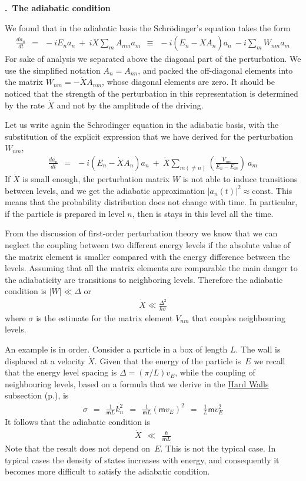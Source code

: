\documentclass[onecolumn,fleqn, 11pt]{revtex4}
\newcommand{\const}{\mathrm{const}}
\newcommand{\mass}{\mathsf{m}}
\newcommand{\beq}{\begin{eqnarray}}
\newcommand{\eeq}{\end{eqnarray}}
\renewcommand{\thesubsection}{\arabic{subsection}}
\renewcommand{\thesubsubsection}{\arabic{subsubsection}}
\newcommand{\sheadC}[1]
{
\addtocounter{subsubsection}{1}
\vspace{5mm}
{\bf \thesubsection.\thesubsubsection \ #1}  
\nopagebreak
\phantomsection
}
\begin{document}
 
\sheadC{The adiabatic condition}

We found that in the adiabatic basis 
the Schr\"{o}dinger's equation takes the form
\beq
\frac{d a_n}{dt} 
\ \ = \ \ -i E_n a_n \ + \ i \dot{X}\sum_m A_{nm} a_m 
 \ \ \equiv \ \ -i(E_n-\dot{X}A_n)a_n \ -i\sum_m W_{nm} a_m 
\eeq
For sake of analysis we separated above  
the diagonal part of the perturbation.
We use the simplified notation $A_n=A_{nn}$, 
and packed the off-diagonal elements 
into the matrix $W_{nm}=-\dot{X}A_{nm}$,
whose diagonal elements are zero. 
It should be noticed that the strength of the perturbation in this 
representation is determined by the rate $\dot{X}$ and not by 
the amplitude of the driving. 

Let us write again the Schrodinger equation 
in the adiabatic basis, with the substitution 
of the explicit expression that we have derived 
for the perturbation $W_{nm}$,  
\beq
\frac{d a_n}{dt} \ \ = \ \ 
-i(E_n-\dot{X}A_n)a_n 
\ + \ 
\dot{X} \sum_{m (\ne n)} \left(\frac{V_{nm}}{E_n-E_m}\right) \ a_m
\eeq
If $\dot{X}$ is small enough,  
the perturbation matrix $W$ is not able to induce 
transitions between levels, 
and we get the adiabatic 
approximation $|a_n(t)|^2 \approx \const$.
This means that the probability distribution 
does not change with time. In particular, 
if the particle is prepared in level $n$, 
then is stays in this level all the time. 


From the discussion of first-order 
perturbation theory we know that we can neglect the coupling 
between two different energy levels if the absolute value of 
the matrix element is smaller compared with the 
energy difference between the levels. 
Assuming that all the matrix elements are 
comparable the main danger to the adiabaticity 
are transitions to neighboring levels.  
Therefore the adiabatic condition is ${|W| \ll \Delta}$ or 
\beq
\dot{X} \ll \frac{\Delta^2}{\hbar \sigma} 
\eeq
where $\sigma$ is the estimate for the 
matrix element $V_{nm}$ that couples 
neighbouring levels.


An example is in order. Consider a particle in a box of length ${L}$. 
The wall is displaced at a velocity ${\dot{X}}$. 
Given that the energy of the particle is~$E$ we recall that 
the energy level spacing is ${\Delta = (\pi/L)v_E }$,   
while the coupling of neighbouring levels, based on a formula 
that we derive in the \hyperref[sWalls]{Hard Walls} subsection (p.\pageref{sWalls}), is 
\beq
\sigma \ \ = \ \ \frac{1}{\mass L} k_n^2 
\ \ = \ \ \frac{1}{\mass L} (\mass v_E)^2
\ \ = \ \ \frac{1}{L} \mass v_E^2
\eeq
It follows that the adiabatic condition is 
\beq
\dot{X} \ \ \ll \ \ \frac{\hbar}{\mass L} 
\eeq
Note that the result does not depend on~$E$. 
This is not the typical case. In typical cases 
the density of states increases with energy, 
and consequently it becomes more difficult 
to satisfy the adiabatic condition.  
\end{document}
